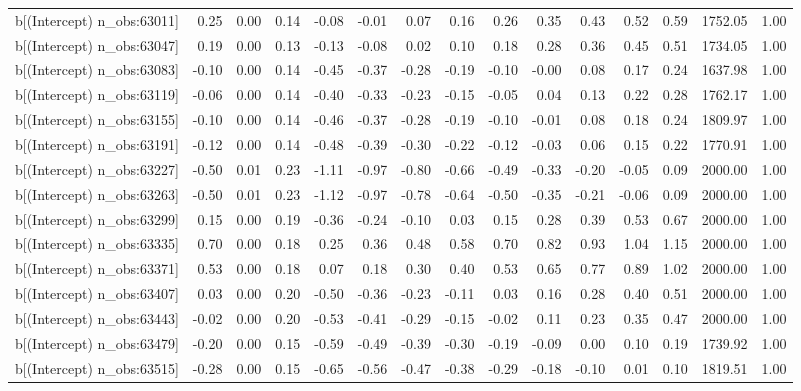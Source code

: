 \begin{table}[ht]
\begin{tabular}{rrrrrrrrrrrrrrr}
  b[(Intercept) n\_obs:63011] & 0.25 & 0.00 & 0.14 & -0.08 & -0.01 & 0.07 & 0.16 & 0.26 & 0.35 & 0.43 & 0.52 & 0.59 & 1752.05 & 1.00 \\ 
  b[(Intercept) n\_obs:63047] & 0.19 & 0.00 & 0.13 & -0.13 & -0.08 & 0.02 & 0.10 & 0.18 & 0.28 & 0.36 & 0.45 & 0.51 & 1734.05 & 1.00 \\ 
  b[(Intercept) n\_obs:63083] & -0.10 & 0.00 & 0.14 & -0.45 & -0.37 & -0.28 & -0.19 & -0.10 & -0.00 & 0.08 & 0.17 & 0.24 & 1637.98 & 1.00 \\ 
  b[(Intercept) n\_obs:63119] & -0.06 & 0.00 & 0.14 & -0.40 & -0.33 & -0.23 & -0.15 & -0.05 & 0.04 & 0.13 & 0.22 & 0.28 & 1762.17 & 1.00 \\ 
  b[(Intercept) n\_obs:63155] & -0.10 & 0.00 & 0.14 & -0.46 & -0.37 & -0.28 & -0.19 & -0.10 & -0.01 & 0.08 & 0.18 & 0.24 & 1809.97 & 1.00 \\ 
  b[(Intercept) n\_obs:63191] & -0.12 & 0.00 & 0.14 & -0.48 & -0.39 & -0.30 & -0.22 & -0.12 & -0.03 & 0.06 & 0.15 & 0.22 & 1770.91 & 1.00 \\ 
  b[(Intercept) n\_obs:63227] & -0.50 & 0.01 & 0.23 & -1.11 & -0.97 & -0.80 & -0.66 & -0.49 & -0.33 & -0.20 & -0.05 & 0.09 & 2000.00 & 1.00 \\ 
  b[(Intercept) n\_obs:63263] & -0.50 & 0.01 & 0.23 & -1.12 & -0.97 & -0.78 & -0.64 & -0.50 & -0.35 & -0.21 & -0.06 & 0.09 & 2000.00 & 1.00 \\ 
  b[(Intercept) n\_obs:63299] & 0.15 & 0.00 & 0.19 & -0.36 & -0.24 & -0.10 & 0.03 & 0.15 & 0.28 & 0.39 & 0.53 & 0.67 & 2000.00 & 1.00 \\ 
  b[(Intercept) n\_obs:63335] & 0.70 & 0.00 & 0.18 & 0.25 & 0.36 & 0.48 & 0.58 & 0.70 & 0.82 & 0.93 & 1.04 & 1.15 & 2000.00 & 1.00 \\ 
  b[(Intercept) n\_obs:63371] & 0.53 & 0.00 & 0.18 & 0.07 & 0.18 & 0.30 & 0.40 & 0.53 & 0.65 & 0.77 & 0.89 & 1.02 & 2000.00 & 1.00 \\ 
  b[(Intercept) n\_obs:63407] & 0.03 & 0.00 & 0.20 & -0.50 & -0.36 & -0.23 & -0.11 & 0.03 & 0.16 & 0.28 & 0.40 & 0.51 & 2000.00 & 1.00 \\ 
  b[(Intercept) n\_obs:63443] & -0.02 & 0.00 & 0.20 & -0.53 & -0.41 & -0.29 & -0.15 & -0.02 & 0.11 & 0.23 & 0.35 & 0.47 & 2000.00 & 1.00 \\ 
  b[(Intercept) n\_obs:63479] & -0.20 & 0.00 & 0.15 & -0.59 & -0.49 & -0.39 & -0.30 & -0.19 & -0.09 & 0.00 & 0.10 & 0.19 & 1739.92 & 1.00 \\ 
  b[(Intercept) n\_obs:63515] & -0.28 & 0.00 & 0.15 & -0.65 & -0.56 & -0.47 & -0.38 & -0.29 & -0.18 & -0.10 & 0.01 & 0.10 & 1819.51 & 1.00 \\ 

\end{tabular}
\end{table}
